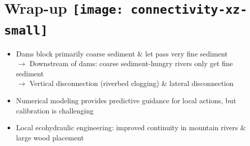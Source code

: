 \section{Wrap-up {\texttt{[image: connectivity-xz-small]}}}

{
%
\begin{frame}[plain]{}{\secname}
	\vspace{2.cm}
		\begin{tcolorbox}[colbacktitle=hellblau!80!black, colback=hellblau!10!white, fonttitle=\bfseries, standard jigsaw,colframe=blue_light, bottom=0mm, middle=0mm, boxsep=0.2mm, opacityframe=0.5, opacityfill=0.65, opacitybacktitle=0.75, title filled, title={\faGraduationCap\ Conclusions}, size=fbox]
			\vspace{0.25cm}
			\begin{itemize}			
				\item[\faChainBroken] Dams block primarily coarse sediment \& let pass very fine sediment\\
				$\rightarrow$ Downstream of dams: coarse sediment-hungry rivers only get fine sediment\\
				$\rightarrow$ Vertical disconnection (riverbed clogging) \& lateral disconnection \vspace{0.1cm}
				\item[\faLightbulbO] Numerical modeling provides predictive guidance for local actions, but calibration is challenging
				\item[\faLightbulbO] Local ecohydraulic engineering: improved continuity in mountain rivers \& large wood placement
			\end{itemize}
			\vspace{0.1cm}
		\end{tcolorbox}
		\smallskip
\end{frame}
}

